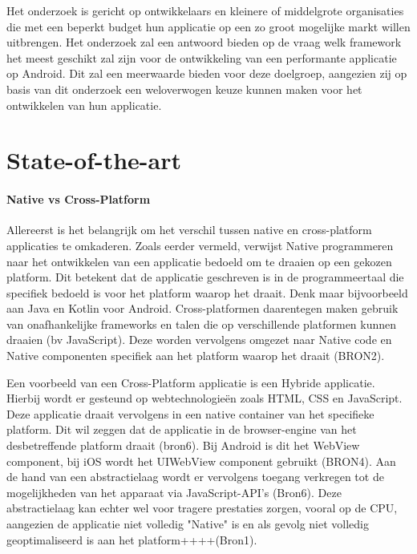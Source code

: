 Het onderzoek is gericht op ontwikkelaars en kleinere of middelgrote organisaties die met een beperkt budget hun applicatie op een zo groot mogelijke markt willen uitbrengen. Het onderzoek zal een antwoord bieden op de vraag welk framework het meest geschikt zal zijn voor de ontwikkeling van een performante applicatie op Android. Dit zal een meerwaarde bieden voor deze doelgroep, aangezien zij op basis van dit onderzoek een weloverwogen keuze kunnen maken voor het ontwikkelen van hun applicatie.


\section{State-of-the-art}%
\label{sec:state-of-the-art}

\paragraph{Native vs Cross-Platform}
\newline
Allereerst is het belangrijk om het verschil tussen native en cross-platform applicaties te omkaderen. Zoals eerder vermeld, verwijst Native programmeren naar het ontwikkelen van een applicatie bedoeld om te draaien op een gekozen platform. Dit betekent dat de applicatie geschreven is in de programmeertaal die specifiek bedoeld is voor het platform waarop het draait. Denk maar bijvoorbeeld aan Java en Kotlin voor Android. Cross-platformen daarentegen maken gebruik van onafhankelijke frameworks en talen die op verschillende platformen kunnen draaien (bv JavaScript). Deze worden vervolgens omgezet naar Native code en Native componenten specifiek aan het platform waarop het draait (BRON2).

Een voorbeeld van een Cross-Platform applicatie is een Hybride applicatie. Hierbij wordt er gesteund op webtechnologieën zoals HTML, CSS en JavaScript. Deze applicatie draait vervolgens in een native container van het specifieke platform. Dit wil zeggen dat de applicatie in de browser-engine van het desbetreffende platform draait (bron6). Bij Android is dit het WebView component, bij iOS wordt het UIWebView component gebruikt (BRON4). Aan de hand van een abstractielaag wordt er vervolgens toegang verkregen tot de mogelijkheden van het apparaat via JavaScript-API's (Bron6). Deze abstractielaag kan echter wel voor tragere prestaties zorgen, vooral op de CPU, aangezien de applicatie niet volledig "Native" is en als gevolg niet volledig geoptimaliseerd is aan het platform++++(Bron1).

